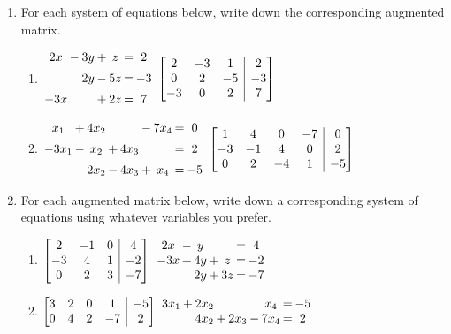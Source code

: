 \documentclass[12pt]{article}
\makeatletter
\newenvironment{amatrix}[1]{%
  \left[\begin{array}{@{}*{#1}{c}|c@{}}
}{%
  \end{array}\right]
}
\newcommand{\bam}{\begin{amatrix}}
\newcommand{\eam}{\end{amatrix}}
\makeatother
\begin{document}
\thispagestyle{fancy}
 \begin{enumerate}
\item For each system of equations below, write down the corresponding augmented matrix.
\begin{enumerate}
 \item $\arraycolsep=1pt\begin{array}{ccccccc}2x&-&3y&+&z&=&2\\[5pt] & &2y&-&5z&=&-3\\[5pt] -3x& & &+&2z&=&7\end{array}$ \hfill $\bam{3} 2&-3&1&2\\0&2&-5&-3\\-3&0&2&7\eam$

\bigskip

 \item $\arraycolsep=1pt\begin{array}{ccccccccc}x_1&+&4x_2& & &-&7x_4&=&0\\[5pt]-3x_1&-&x_2&+&4x_3& & &=&2\\[5pt] & &2x_2&-&4x_3&+&x_4&=&-5\end{array}$ \hfill 
$\bam{4} 1&4&0&-7&0\\-3&-1&4&0&2\\0&2&-4&1&-5\eam$

\end{enumerate}

\bigskip


\item For each augmented matrix below, write down a corresponding system of equations using whatever variables you prefer.
\begin{enumerate}
 \item $\bam{3}2&-1&0&4\\-3&4&1&-2\\0&2&3&-7\eam$ \hfill $\arraycolsep=1pt\begin{array}{ccccccc}2x&-&y& & &=&4\\-3x&+&4y&+&z&=&-2\\& &2y&+&3z&=&-7\end{array}$

\bigskip

 \item $\bam{4}3&2&0&1&-5\\0&4&2&-7&2\eam$ \hfill $\arraycolsep=1pt\begin{array}{ccccccccc}3x_1&+&2x_2& & & & x_4&=&-5\\& &4x_2&+&2x_3&-&7x_4&=&2\end{array}$
\end{enumerate}


\end{enumerate}
\end{document}
